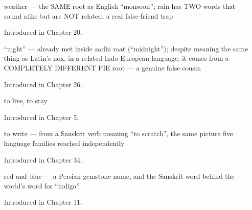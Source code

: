 \noindent\begin{minipage}[t]{\linewidth}
\raggedright
\textbf{}\par
\small weather — the SAME root as English \textquotedblleft{}monsoon\textquotedblright{}; rain has TWO words that sound alike but are NOT related, a real false-friend trap\par
\footnotesize Introduced in Chapter 20.
\end{minipage}\par\medskip

\noindent\begin{minipage}[t]{\linewidth}
\raggedright
\textbf{}\par
\small \textquotedblleft{}night\textquotedblright{} — already met inside aadhi raat (\textquotedblleft{}midnight\textquotedblright{}); despite meaning the same thing as Latin's nox, in a related Indo-European language, it comes from a COMPLETELY DIFFERENT PIE root — a genuine false cousin\par
\footnotesize Introduced in Chapter 26.
\end{minipage}\par\medskip

\noindent\begin{minipage}[t]{\linewidth}
\raggedright
\textbf{}\par
\small to live, to stay\par
\footnotesize Introduced in Chapter 5.
\end{minipage}\par\medskip

\noindent\begin{minipage}[t]{\linewidth}
\raggedright
\textbf{}\par
\small to write — from a Sanskrit verb meaning \textquotedblleft{}to scratch\textquotedblright{}, the same picture five language families reached independently\par
\footnotesize Introduced in Chapter 34.
\end{minipage}\par\medskip

\noindent\begin{minipage}[t]{\linewidth}
\raggedright
\textbf{ }\par
\small red and blue — a Persian gemstone-name, and the Sanskrit word behind the world's word for \textquotedblleft{}indigo\textquotedblright{}\par
\footnotesize Introduced in Chapter 11.
\end{minipage}\par\medskip

